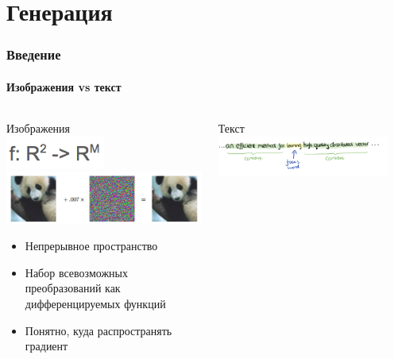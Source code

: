 \documentclass[10pt]{beamer}
\begin{document}
\section{Генерация}
\begin{frame}
\frametitle{Введение}
\framesubtitle{Изображения vs текст}

\begin{columns}[T]
    \begin{column}[T]{0.5\textwidth}
        \begin{center}
            Изображения \\
            \includegraphics[width=0.5\textwidth]{images/image_as_func.png} \\
            \includegraphics[width=\textwidth]{images/panda_plus_noise.png} \\
            \begin{itemize}
                \item Непрерывное пространство
                \item Набор всевозможных преобразований как дифференцируемых функций
                \item Понятно, куда распространять градиент
            \end{itemize}
        \end{center}
    \end{column}
    \vline
    \begin{column}[T]{0.5\textwidth}
        \begin{center}
            Текст \\
            \includegraphics[width=0.9\textwidth]{images/word_context.png} \\

\end{center}
\end{column}
\end{columns}
\end{frame}
\end{document}
